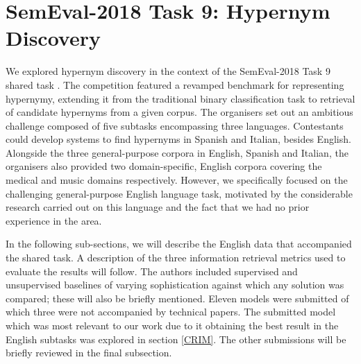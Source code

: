 \section{SemEval-2018 Task 9: Hypernym Discovery}
%

We explored hypernym discovery in the context of the SemEval-2018 Task 9 shared task \citep{camacho2018semeval}.  The competition featured a revamped benchmark for representing hypernymy, extending it from the traditional binary classification task to retrieval of candidate hypernyms from a given corpus.  The organisers set out an ambitious challenge composed of five subtasks encompassing three languages.  Contestants could develop systems to find hypernyms in Spanish and Italian, besides English.  Alongside the three general-purpose corpora in English, Spanish and Italian, the organisers also provided two domain-specific, English corpora covering the medical and music domains respectively.  However, we specifically focused on the challenging general-purpose English language task, motivated by the considerable research carried out on this language and the fact that we had no prior experience in the area.

In the following sub-sections, we will describe the English data that accompanied the shared task. A description of the three information retrieval  metrics used to evaluate the results will follow. The authors included supervised and unsupervised baselines of varying sophistication against which any solution was compared; these will also be briefly mentioned.  Eleven models were submitted of which three were not accompanied by technical papers.  The submitted model which was most relevant to our work due to it obtaining the best result in the English subtasks was explored in section \ref{CRIM}.  The other submissions will be briefly reviewed in the final subsection.

